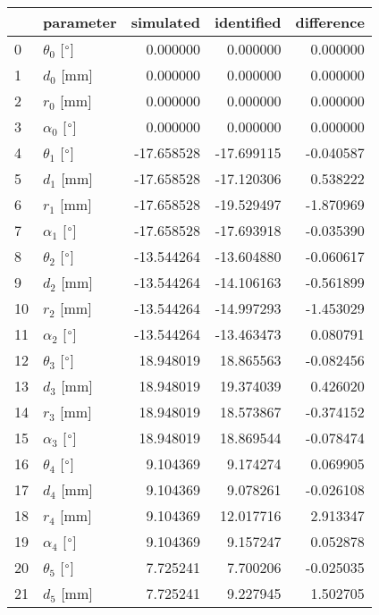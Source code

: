 \documentclass{standalone}%
\begin{document}
%
\normalsize%
\begin{tabular}{llrrr}
\toprule
{} &                 parameter &  simulated & identified & difference \\
\midrule
0  &  $\theta_{0}$ [$\degree$] &   0.000000 &   0.000000 &   0.000000 \\
1  &              $d_{0}$ [mm] &   0.000000 &   0.000000 &   0.000000 \\
2  &              $r_{0}$ [mm] &   0.000000 &   0.000000 &   0.000000 \\
3  &  $\alpha_{0}$ [$\degree$] &   0.000000 &   0.000000 &   0.000000 \\
4  &  $\theta_{1}$ [$\degree$] & -17.658528 & -17.699115 &  -0.040587 \\
5  &              $d_{1}$ [mm] & -17.658528 & -17.120306 &   0.538222 \\
6  &              $r_{1}$ [mm] & -17.658528 & -19.529497 &  -1.870969 \\
7  &  $\alpha_{1}$ [$\degree$] & -17.658528 & -17.693918 &  -0.035390 \\
8  &  $\theta_{2}$ [$\degree$] & -13.544264 & -13.604880 &  -0.060617 \\
9  &              $d_{2}$ [mm] & -13.544264 & -14.106163 &  -0.561899 \\
10 &              $r_{2}$ [mm] & -13.544264 & -14.997293 &  -1.453029 \\
11 &  $\alpha_{2}$ [$\degree$] & -13.544264 & -13.463473 &   0.080791 \\
12 &  $\theta_{3}$ [$\degree$] &  18.948019 &  18.865563 &  -0.082456 \\
13 &              $d_{3}$ [mm] &  18.948019 &  19.374039 &   0.426020 \\
14 &              $r_{3}$ [mm] &  18.948019 &  18.573867 &  -0.374152 \\
15 &  $\alpha_{3}$ [$\degree$] &  18.948019 &  18.869544 &  -0.078474 \\
16 &  $\theta_{4}$ [$\degree$] &   9.104369 &   9.174274 &   0.069905 \\
17 &              $d_{4}$ [mm] &   9.104369 &   9.078261 &  -0.026108 \\
18 &              $r_{4}$ [mm] &   9.104369 &  12.017716 &   2.913347 \\
19 &  $\alpha_{4}$ [$\degree$] &   9.104369 &   9.157247 &   0.052878 \\
20 &  $\theta_{5}$ [$\degree$] &   7.725241 &   7.700206 &  -0.025035 \\
21 &              $d_{5}$ [mm] &   7.725241 &   9.227945 &   1.502705 \\

\end{tabular}
\end{document}
